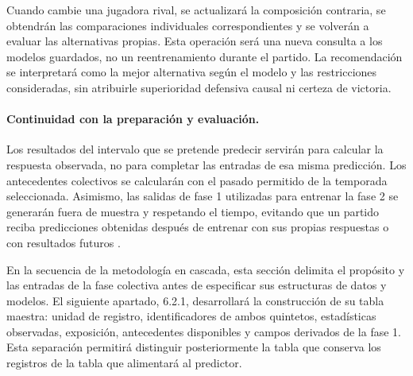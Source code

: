 Cuando cambie una jugadora rival, se actualizará la composición contraria, se obtendrán las comparaciones individuales correspondientes y se volverán a evaluar las alternativas propias. Esta operación será una nueva consulta a los modelos guardados, no un reentrenamiento durante el partido. La recomendación se interpretará como la mejor alternativa según el modelo y las restricciones consideradas, sin atribuirle superioridad defensiva causal ni certeza de victoria.

\paragraph*{Continuidad con la preparación y evaluación.}
Los resultados del intervalo que se pretende predecir servirán para calcular la respuesta observada, no para completar las entradas de esa misma predicción. Los antecedentes colectivos se calcularán con el pasado permitido de la temporada seleccionada. Asimismo, las salidas de fase 1 utilizadas para entrenar la fase 2 se generarán fuera de muestra y respetando el tiempo, evitando que un partido reciba predicciones obtenidas después de entrenar con sus propias respuestas o con resultados futuros \cite{sklearnCommonPitfallsPonderacion,cawley2010selection}.

En la secuencia de la metodología en cascada, esta sección delimita el propósito y las entradas de la fase colectiva antes de especificar sus estructuras de datos y modelos. El siguiente apartado, 6.2.1, desarrollará la construcción de su tabla maestra: unidad de registro, identificadores de ambos quintetos, estadísticas observadas, exposición, antecedentes disponibles y campos derivados de la fase 1. Esta separación permitirá distinguir posteriormente la tabla que conserva los registros de la tabla que alimentará al predictor.
